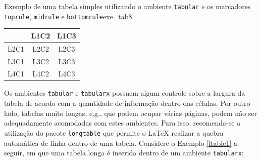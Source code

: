 \begin{texexptitled}[breakable,center lower,enhanced,middle=2mm]{Exemplo de uma tabela simples utilizando o ambiente {\tt tabular} e os marcadores {\tt toprule}, {\tt midrule} e {\tt bottomrule}}{exe_tab8}
\begin{tabular}[t]{lcc}
\toprule
     & L1C2 & L1C3 \\
\midrule
L2C1 & L2C2 & L2C3 \\
L3C1 & L3C2 & L3C3 \\
L4C1 & L4C2 & L4C3 \\
\bottomrule
\end{tabular}
\end{texexptitled}




Os ambientes {\tt tabular} e {\tt tabularx} possuem algum controle sobre a largura da tabela de acordo com a quantidade de informação dentro das células. Por outro lado, tabelas muito longas, e.g., que podem ocupar várias páginas, podem não ser adequadamente acomodadas com estes ambientes. Para isso, recomenda-se a utilização do pacote {\tt longtable} que permite o \LaTeX{} realizar a quebra automática de linha dentro de uma tabela. Considere o Exemplo \ref{ltable1} a seguir, em que uma tabela longa é inserida dentro de um ambiente {\tt tabularx}:

